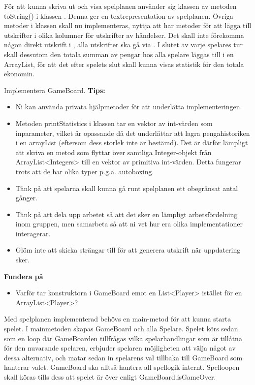 \Task För att kunna skriva ut och visa spelplanen använder sig klassen   av metoden toString() i klassen . Denna ger en textrepresentation av spelplanen. Övriga metoder i klassen  skall nu implementeras, nyttja att   har metoder för att lägga till utskrifter i olika kolumner för utskrifter av händelser. Det skall inte förekomma någon direkt utskrift i  , alla utskrifter ska gå via . I slutet av varje spelares tur skall dessutom den totala summan av pengar hos alla spelare läggas till i en ArrayList, för att det efter spelets slut skall kunna visas statistik för den totala ekonomin. 

\Subtask Implementera GameBoard.
\newline
\newline
\textbf{Tips:}

\begin{itemize}
\item Ni kan använda privata hjälpmetoder för att underlätta implementeringen.
\item Metoden printStatistics i klassen  tar en vektor av int-värden som inparameter, vilket är opassande då det underlättar att lagra pengahistoriken i en arrayList (eftersom dess storlek inte är bestämd). Det är därför lämpligt att skriva en metod som flyttar över samtliga Integer-objekt från ArrayList<Integers> till en vektor av primitiva int-värden. Detta fungerar trots att de har olika typer p.g.a. autoboxing. 
\item Tänk på att spelarna skall kunna gå runt spelplanen ett obegränsat antal gånger.
\item Tänk på att dela upp arbetet så att det sker en lämpligt arbetsfördelning inom gruppen, men samarbeta så att ni vet hur era olika implementationer interagerar.
\item Glöm inte att skicka strängar till   för att generera utskrift när uppdatering sker.
\end{itemize}

\textbf{Fundera på}
\begin{itemize}
\item Varför tar konstruktorn i GameBoard emot en List<Player> istället för en ArrayList<Player>?
\end{itemize}

\Task Med spelplanen implementerad behövs en main-metod för att kunna starta spelet. I mainmetoden skapas GameBoard och alla Spelare. Spelet körs sedan som en loop där GameBoarden tillfrågas vilka spelarhandlingar som är tillåtna för den nuvarande spelaren, erbjuder spelaren möjligheten att välja något av dessa alternativ, och matar sedan in spelarens val tillbaka till GameBoard som hanterar valet. GameBoard ska alltså hantera all spellogik internt.  Spelloopen skall köras tills dess att spelet är över enligt GameBoard.isGameOver.


